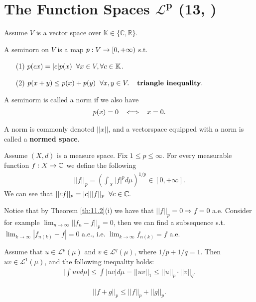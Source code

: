 \section{The Function Spaces \(\boldsymbol{\mathcal{L}^p}\) \tiny{(13, \cite{schilling2017measures})}}
Assume $V$ is a vector space over $\mathbb K\in\{\mathbb C,\mathbb R\}$.

\begin{definition}
    A seminorn on $V$ is a map $p:V\rightarrow [0,+\infty)$ s.t. 
    \begin{itemize}
        \item[(1)] $p(cx)=|c|p(x)\hspace{2mm} \forall x\in V,\forall c\in \mathbb K$.
        \item[(2)] $p(x+y)\leq p(x) +p(y)\hspace{2mm} \forall x,y\in V. \hspace{4mm} \textbf{triangle inequality}. $
    \end{itemize}
    A seminorm is called a norm if we also have \begin{align*}
        p(x)=0\hspace{2mm} \iff \hspace{2mm} x=0.
    \end{align*}
\end{definition}

A norm is commonly denoted $||x||$, and a vectorspace equipped with a norm is called a \textbf{normed space}.


\begin{definition}
    Assume $(X,d)$ is a measure space. Fix $1\leq p\leq \infty.$ For every measurable function $f:X\rightarrow \mathbb{C}$ we define the following
    \begin{align}
        ||f||_p = \left( \int_X |f|^p d\mu\right)^{1/p}\in [0,+\infty].
    \end{align} 
    We can see that $||cf||_p=|c|||f||_p\hspace{2mm} \forall c\in\mathbb{C}.$ 
    
    Notice that by Theorem \ref{th:11.2}(i) we have that \(||f||_p=0\Rightarrow 
    f=0\) a.e. Consider for example \(\lim_{n\rightarrow\infty}||f_n-f||_p=0\), then we can find a subsequence s.t. 
    \(\lim_{k\rightarrow\infty}|f_{n(k)}-f|=0\) a.e., i.e.
    \(\lim_{k\rightarrow\infty}f_{n(k)} = f\) a.e. 
\end{definition}

\begin{theorem}
    Assume that \(u\in\mathcal{L}^p(\mu)\) and \(v\in\mathcal{L}^q(\mu)\), where \(1/p+1/q=1\). Then \(uv\in\mathcal{L}^1(\mu)\), and the following inequality holds:
    \begin{align*}
        \Big\vert \int uv d\mu \Big\vert \leq \int |uv| d\mu=||uv||_1 \leq||u||_p\cdot ||v||_q.
    \end{align*}
    
\end{theorem}
\begin{lemma}
    \begin{align}
        ||f+g||_p\leq ||f||_p+||g||_p.
    \end{align}
\end{lemma}

